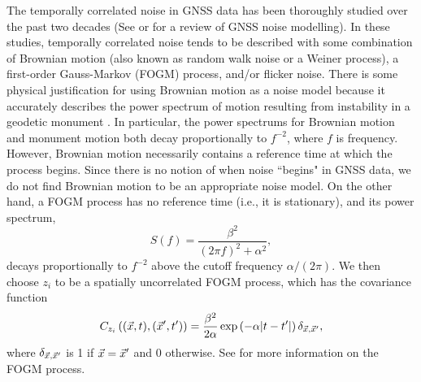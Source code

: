 \documentclass[extra,mreferee]{gji}
\begin{document}

The temporally correlated noise in GNSS data has been thoroughly
studied over the past two decades \citep[e.g.,][]{Zhang1997, Mao1999,
Williams2004, Langbein2008} (See \citet{Bock2016} or \citet{He2017}
for a review of GNSS noise modelling). In these studies, temporally
correlated noise tends to be described with some combination of
Brownian motion (also known as random walk noise or a Weiner process),
a first-order Gauss-Markov (FOGM) process, and/or flicker noise. There
is some physical justification for using Brownian motion as a noise
model because it accurately describes the power spectrum of motion
resulting from instability in a geodetic monument
\citep[e.g.,][]{Wyatt1982, Wyatt1989}. In particular, the power
spectrums for Brownian motion and monument motion both decay
proportionally to $f^{-2}$, where $f$ is frequency. However, Brownian
motion necessarily contains a reference time at which the process
begins. Since there is no notion of when noise ``begins" in GNSS data,
we do not find Brownian motion to be an appropriate noise model. On
the other hand, a FOGM process has no reference time (i.e., it is
stationary), and its power spectrum, \begin{equation}\label{eq:FOGMPS}
S(f) = \frac{\beta^2}{(2 \pi f)^2 + \alpha^2}, \end{equation} decays
proportionally to $f^{-2}$ above the cutoff frequency $\alpha / (2
\pi)$. We then choose $z_i$ to be a spatially uncorrelated FOGM
process, which has the covariance function
\begin{equation}\label{eq:FOGM}
C_{z_i}\left((\vec{x},t),(\vec{x}',t')\right) = \frac{\beta^2}{2\alpha}
\exp\left(-\alpha|t - t'|\right)\delta_{\vec{x},\vec{x}'}, \end{equation}
where $\delta_{\vec{x},\vec{x}'}$ is 1 if $\vec{x} = \vec{x}'$ and 0 otherwise.
See \citet[sec. B2]{Rasmussen2006} for more information on the FOGM
process.

\end{document}
